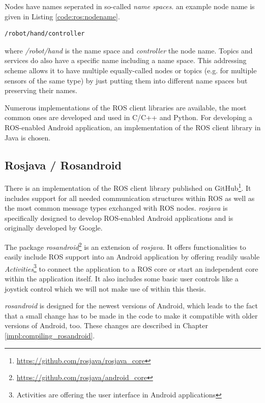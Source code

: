 Nodes have names seperated in so-called \textit{name spaces}. an example node name is given in Listing \ref{code:ros:nodename}.
\begin{lstlisting}[caption={An example ROS node name},label=code:ros:nodename]
/robot/hand/controller
\end{lstlisting}


where \textit{/robot/hand} is the name space and \textit{controller} the node name. Topics and services do also have a specific name including a name space. This addressing scheme allows it to have multiple equally-called nodes or topics (e.g. for multiple sensors of the same type) by just putting them into different name spaces but preserving their names.

Numerous implementations of the ROS client libraries are available, the most common ones are developed and used in C/C++ and Python\cite{ros:client_libraries}. For developing a ROS-enabled Android application, an implementation of the ROS client library in Java is chosen. 

\subsection{Rosjava / Rosandroid}

There is an implementation of the ROS client library published on GitHub\footnote{\url{https://github.com/rosjava/rosjava_core}}. It includes support for all needed communication structures within ROS as well as the most common message types exchanged with ROS nodes. \textit{rosjava} is specifically designed to develop ROS-enabled Android applications and is originally developed by Google\cite{ros:rosjava:readme}.

The package \textit{rosandroid}\footnote{\url{https://github.com/rosjava/android_core}} is an extension of \textit{rosjava}. It offers functionalities to easily include ROS support into an Android application by offering readily usable \textit{Activities}\footnote{Activities are offering the user interface in Android applications} to connect the application to a ROS core or start an independent core within the application itself. It also includes some basic user controls like a joystick control which we will not make use of within this thesis.

\textit{rosandroid} is designed for the newest versions of Android, which leads to the fact that a small change has to be made in the code to make it compatible with older versions of Android, too. These changes are described in Chapter \ref{impl:compiling_rosandroid}.

